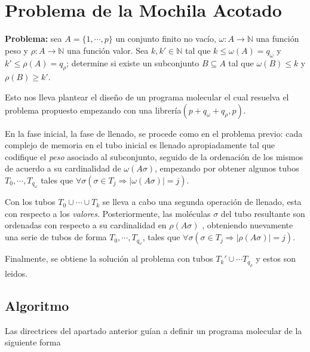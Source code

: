\documentclass[12pt, letterpaper, twoside]{article}
\begin{document}
    \section{Problema de la Mochila Acotado}
    \textbf{Problema:} sea $A=\{1,\cdots,p\}$ un conjunto finito no vacío, $\omega:A\rightarrow\mathbb{N}$ una función peso y $\rho:A\rightarrow\mathbb{N}$ una función valor. Sea $k, k'\in\mathbb{N}$ tal que $k\leq\omega(A)=q_\omega$ y $k'\leq\rho(A)=q_\rho$; determine si existe un subconjunto $B\subseteq A$ tal que $\omega(B)\leq k$ y $\rho(B)\geq k'$.


    Esto nos lleva plantear el diseño de un programa molecular el cual resuelva el problema propuesto empezando con una librería$(p+q_\omega+q_\rho, p)$.


    En la fase inicial, la fase de llenado, se procede como en el problema previo: cada complejo de memoria en el tubo inicial es llenado apropiadamente tal que codifique el \emph{peso} asociado al subconjunto, seguido de la ordenación de los mismos de acuerdo a su cardinalidad de $\omega(A\sigma)$, empezando por obtener algunos tubos $T_0,\cdots,T_{q_\omega}$ tales que $\forall\sigma(\sigma\in T_j \Rightarrow |\omega(A\sigma)|=j)$.


    Con los tubos $T_0\cup\cdots\cup T_k$ se lleva a cabo una segunda operación de llenado, esta con respecto a los \emph{valores}. Posteriormente, las moléculas $\sigma$ del tubo resultante son ordenadas con respecto a su cardinalidad en $\rho(A\sigma)$ , obteniendo nuevamente una serie de tubos de forma $T_0,\cdots,T_{q_\omega}$, tales que $\forall\sigma(\sigma\in T_j \Rightarrow |\rho(A\sigma)| = j)$.


    Finalmente, se obtiene la solución al problema con tubos $T_k'\cup\cdots T_{q_\rho}$ y estos son leidos.
    \newpage
    \subsection{Algoritmo}
    Las directrices del apartado anterior guían a definir un programa molecular de la siguiente forma

    \begin{algorithm}
        \begin{algorithmic}[1]
            \EndFor
            \EndFor
            \EndProcedure
        \end{algorithmic}
    \end{algorithm}
\end{document}
